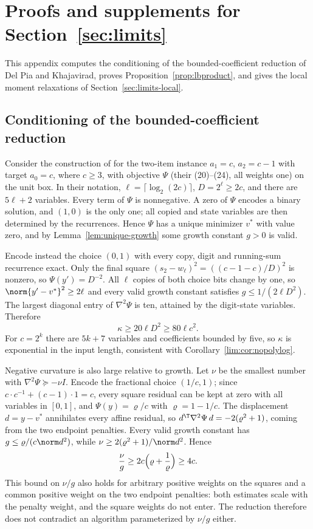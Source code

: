 \section{Proofs and supplements for Section~\ref{sec:limits}}\label{app:limits}

This appendix computes the conditioning of the bounded-coefficient reduction
of Del Pia and Khajavirad, proves Proposition~\ref{prop:lbproduct}, and gives
the local moment relaxations of Section~\ref{sec:limits-local}.

\subsection{Conditioning of the bounded-coefficient reduction}\label{app:dk}

\begin{remark}
\label{lim:rem:dk}
Consider the construction of \cite[Theorem~3]{DelPiaKhajavirad2026} for the
two-item instance $a_1=c$, $a_2=c-1$ with target $a_0=c$, where $c\ge3$, with
objective $\Psi$ (their (20)--(24), all weights one) on the unit box. In
their notation, $\ell=\lceil\log_2(2c)\rceil$, $D=2^\ell\ge2c$, and there are
$5\ell+2$ variables. Every term of $\Psi$ is nonnegative. A zero of $\Psi$
encodes a binary solution, and $(1,0)$ is the only one; all copied and state
variables are then determined by the recurrences. Hence $\Psi$ has a unique
minimizer $v^*$ with value zero, and by Lemma~\ref{lem:unique-growth} some
growth constant $g>0$ is valid.

Encode instead the choice $(0,1)$ with every copy, digit and running-sum
recurrence exact. Only the final square
$(s_2-w_\ell)^2=((c-1-c)/D)^2$ is nonzero, so $\Psi(y')=D^{-2}$. All
$\ell$ copies of both choice bits change by one, so
$\norm{y'-v^*}^2\ge2\ell$ and every valid growth constant satisfies
$g\le1/(2\ell D^2)$. The largest diagonal entry of $\nabla^2\Psi$ is ten,
attained by the digit-state variables. Therefore
\[
\kappa\ge20\ell D^2\ge80\ell c^2 .
\]
For $c=2^k$ there are $5k+7$ variables and coefficients bounded by five, so
$\kappa$ is exponential in the input length, consistent with
Corollary~\ref{lim:cor:nopolylog}.

Negative curvature is also large relative to growth. Let $\nu$ be the
smallest number with $\nabla^2\Psi\succeq-\nu I$. Encode the fractional
choice $(1/c,1)$; since $c\cdot c^{-1}+(c-1)\cdot1=c$, every square residual
can be kept at zero with all variables in $[0,1]$, and $\Psi(y)=\varrho/c$
with $\varrho=1-1/c$. The displacement $d=y-v^*$ annihilates every affine
residual, so $d^{\T}\nabla^2\Psi\,d=-2(\varrho^2+1)$, coming from the two
endpoint penalties. Every valid growth constant has
$g\le\varrho/(c\norm d^2)$, while $\nu\ge2(\varrho^2+1)/\norm d^2$. Hence
\[
\frac\nu g\ge2c\Bigl(\varrho+\frac1\varrho\Bigr)\ge4c .
\]
This bound on $\nu/g$ also holds for arbitrary positive weights on the
squares and a common positive weight on the two endpoint penalties: both
estimates scale with the penalty weight, and the square weights do not
enter. The reduction therefore does not contradict an algorithm
parameterized by $\nu/g$ either.
\end{remark}

